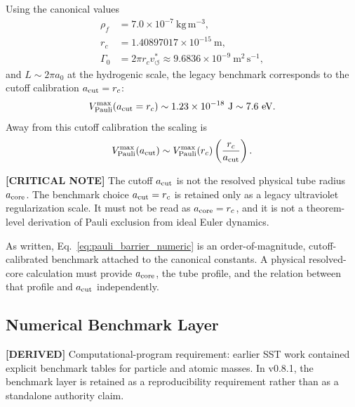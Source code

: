 \documentclass[11pt]{article}
\theoremstyle{definition}
\theoremstyle{plain}
\theoremstyle{remark}
\newcommand{\vchar}{v_{\!\boldsymbol{\circlearrowleft}}^{\ast}}
\begin{document}
        Using the canonical values
        \begin{align}
            \rho_{\!f} &= 7.0 \times 10^{-7}\ \mathrm{kg\,m^{-3}}, \nonumber\\
            r_c &= 1.40897017 \times 10^{-15}\ \mathrm{m}, \nonumber\\
            \Gamma_0 &= 2\pi r_c \vchar
            \approx 9.6836\times 10^{-9}\ \mathrm{m^2\,s^{-1}},
        \end{align}
        and \(L \sim 2\pi a_0\) at the hydrogenic scale, the legacy benchmark corresponds to the cutoff calibration \(a_{\rm cut}=r_c\):
        \begin{align}
            V_{\mathrm{Pauli}}^{\max}(a_{\rm cut}=r_c)
            \sim 1.23\times 10^{-18}\ \mathrm{J}
            \sim 7.6\ \mathrm{eV}.
            \label{eq:pauli_barrier_numeric}
        \end{align}
        Away from this cutoff calibration the scaling is
        \begin{align}
            V_{\mathrm{Pauli}}^{\max}(a_{\rm cut})
            \sim
            V_{\mathrm{Pauli}}^{\max}(r_c)
            \left(\frac{r_c}{a_{\rm cut}}\right).
            \label{eq:pauli_barrier_acut_scaling}
        \end{align}

        \textbf{[CRITICAL NOTE]} The cutoff \(a_{\rm cut}\) is not the resolved physical tube radius \(a_{\rm core}\).  The benchmark choice \(a_{\rm cut}=r_c\) is retained only as a legacy ultraviolet regularization scale.  It must not be read as \(a_{\rm core}=r_c\), and it is not a theorem-level derivation of Pauli exclusion from ideal Euler dynamics.

        As written, Eq.~\eqref{eq:pauli_barrier_numeric} is an order-of-magnitude, cutoff-calibrated benchmark attached to the canonical constants. A physical resolved-core calculation must provide \(a_{\rm core}\), the tube profile, and the relation between that profile and \(a_{\rm cut}\) independently.

    \subsection{Numerical Benchmark Layer}
        \label{subsec:integration_benchmarks}

        \textbf{[DERIVED]} Computational-program requirement: earlier SST work contained explicit benchmark tables for particle and
        atomic masses. In v0.8.1, the benchmark layer is retained as a reproducibility requirement rather than as a
        standalone authority claim.
\end{document}
